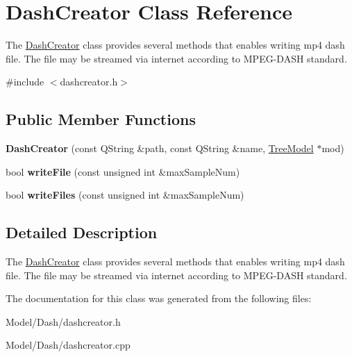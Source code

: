 \hypertarget{class_dash_creator}{\section{Dash\-Creator Class Reference}
\label{class_dash_creator}
}


The \hyperlink{class_dash_creator}{Dash\-Creator} class provides several methods that enables writing mp4 dash file. The file may be streamed via internet according to M\-P\-E\-G-\/\-D\-A\-S\-H standard.  




{\ttfamily \#include $<$dashcreator.\-h$>$}

\subsection*{Public Member Functions}
\begin{DoxyCompactItemize}
\item 
\hypertarget{class_dash_creator_af4545342e3a1ab0aac61e1b0b6265370}{{\bfseries Dash\-Creator} (const Q\-String \&path, const Q\-String \&name, \hyperlink{class_tree_model}{Tree\-Model} $\ast$mod)}\label{class_dash_creator_af4545342e3a1ab0aac61e1b0b6265370}

\item 
\hypertarget{class_dash_creator_adb1268e79a32fe34c75bed9b04a1357e}{bool {\bfseries write\-File} (const unsigned int \&max\-Sample\-Num)}\label{class_dash_creator_adb1268e79a32fe34c75bed9b04a1357e}

\item 
\hypertarget{class_dash_creator_a324d4deedf4f0e06881aeef712e79917}{bool {\bfseries write\-Files} (const unsigned int \&max\-Sample\-Num)}\label{class_dash_creator_a324d4deedf4f0e06881aeef712e79917}

\end{DoxyCompactItemize}


\subsection{Detailed Description}
The \hyperlink{class_dash_creator}{Dash\-Creator} class provides several methods that enables writing mp4 dash file. The file may be streamed via internet according to M\-P\-E\-G-\/\-D\-A\-S\-H standard. 

The documentation for this class was generated from the following files\-:\begin{DoxyCompactItemize}
\item 
Model/\-Dash/dashcreator.\-h\item 
Model/\-Dash/dashcreator.\-cpp\end{DoxyCompactItemize}
